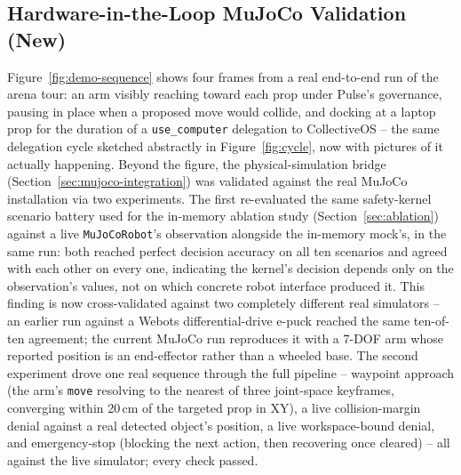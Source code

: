 \documentclass{article}
\begin{document}
\subsection{Hardware-in-the-Loop MuJoCo Validation (New)}
\label{sec:mujoco-real}
Figure~\ref{fig:demo-sequence} shows four frames from a real end-to-end run of the arena tour: an arm visibly reaching toward each prop under Pulse's governance, pausing in place when a proposed move would collide, and docking at a laptop prop for the duration of a \texttt{use\_computer} delegation to CollectiveOS -- the same delegation cycle sketched abstractly in Figure~\ref{fig:cycle}, now with pictures of it actually happening. Beyond the figure, the physical-simulation bridge (Section~\ref{sec:mujoco-integration}) was validated against the real MuJoCo installation via two experiments. The first re-evaluated the same safety-kernel scenario battery used for the in-memory ablation study (Section~\ref{sec:ablation}) against a live \texttt{MuJoCoRobot}'s observation alongside the in-memory mock's, in the same run: both reached perfect decision accuracy on all ten scenarios and agreed with each other on every one, indicating the kernel's decision depends only on the observation's values, not on which concrete robot interface produced it. This finding is now cross-validated against two completely different real simulators -- an earlier run against a Webots differential-drive e-puck reached the same ten-of-ten agreement; the current MuJoCo run reproduces it with a 7-DOF arm whose reported position is an end-effector rather than a wheeled base. The second experiment drove one real sequence through the full pipeline -- waypoint approach (the arm's \texttt{move} resolving to the nearest of three joint-space keyframes, converging within 20\,cm of the targeted prop in XY), a live collision-margin denial against a real detected object's position, a live workspace-bound denial, and emergency-stop (blocking the next action, then recovering once cleared) -- all against the live simulator; every check passed.
\end{document}
